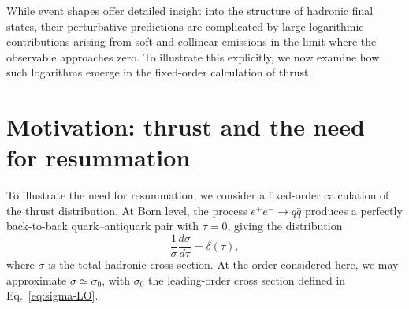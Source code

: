 While event shapes offer detailed insight into the structure of hadronic 
final states, their perturbative predictions are complicated by large 
logarithmic contributions arising from soft and collinear emissions in 
the limit where the observable approaches zero. To illustrate this 
explicitly, we now examine how such logarithms emerge in the fixed-order 
calculation of thrust.

\section{Motivation: thrust and the need for resummation}
\label{sec:thrust-example}

To illustrate the need for resummation, we consider a fixed-order 
calculation of the thrust distribution. At Born level, the process 
$e^+e^- \to q\bar{q}$ produces a perfectly back-to-back quark--antiquark 
pair with $\tau = 0$, giving the distribution
\begin{equation}
    \frac{1}{\sigma}\frac{d\sigma}{d\tau} = \delta(\tau),
\end{equation}
where $\sigma$ is the total hadronic cross section. At the order
considered here, we may approximate $\sigma \simeq \sigma_0$, with
$\sigma_0$ the leading-order cross section defined in
Eq.~\eqref{eq:sigma-LO}.

